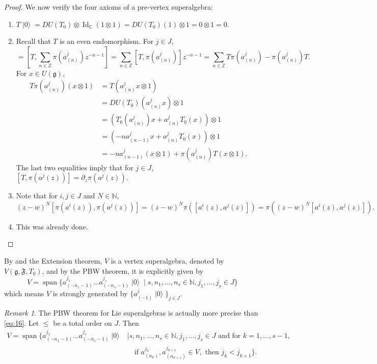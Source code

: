 \documentclass[a4paper, 12pt, reqno]{amsart}
\theoremstyle{remark}
\newtheorem{remark}[theorem]{Remark}
\numberwithin{equation}{subsection}
\DeclareMathOperator{\Id}{Id}
\DeclareMathOperator{\vspan}{span}
\DeclareMathOperator{\vac}{|0\rangle}
\DeclareMathOperator{\one}{\overline{1}}
\begin{document}
\begin{proof}
  We now verify the four axioms of a pre-vertex superalgebra:
  \begin{enumerate}
  \item $T\vac = DU(T_0) \otimes \Id_{\mathbb{C}}(1\otimes1) = DU(T_0)(1)\otimes1 = 0\otimes1 = 0$.
  \item Recall that $T$ is an even endomorphism.
    For $j \in J$,
    \begin{equation*}
      [T, \pi(a^j(z))] = \left[T, \sum_{n \in \mathbb{Z}}\pi(a^j_{(n)})z^{-n - 1}\right] = \sum_{n \in \mathbb{Z}}[T, \pi(a^j_{(n)})]z^{-n - 1} = \sum_{n \in \mathbb{Z}}T\pi(a^j_{(n)}) - \pi(a^j_{(n)})T.
    \end{equation*}
    For $x \in U(\mathfrak{g})$,
    \begin{align*}
      T\pi(a^j_{(n)})(x\otimes1) &= T(a^j_{(n)}x\otimes1) \\
      &= DU(T_0)(a^j_{(n)}x)\otimes1 \\
      &= (T_0(a^j_{(n)})x + a^j_{(n)}T_0(x))\otimes1 \\
      &= (-na^j_{(n - 1)}x + a^j_{(n)}T_0(x))\otimes1 \\
      &= -na^j_{(n - 1)}(x\otimes1) + \pi(a^j_{(n)})T(x\otimes 1).
    \end{align*}
    The last two equalities imply that for $j \in J$, $[T, \pi(a^j(z))] = \partial_z\pi(a^j(z))$.
  \item Note that for $i, j \in J$ and $N \in \mathbb{N}$,
    \begin{equation*}
      (z - w)^N[\pi(a^i(z)), \pi(a^j(z))] = (z - w)^N\pi([a^i(z), a^j(z)]) = \pi((z - w)^N[a^i(z), a^j(z)]).
    \end{equation*}
  \item This was already done. \qedhere
  \end{enumerate}
\end{proof}

By  and the Extension theorem, $V$ is a vertex superalgebra, denoted by $V(\mathfrak{g}, \mathfrak{F}, T_0)$, and by the PBW theorem, it is explicitly given by
\begin{equation}
  \label{eq:16}
  V = \vspan\{a^{j_1}_{(-n_1 - 1)}\dots a^{j_s}_{(-n_s - 1)}\vac \mid s, n_1, \dots, n_s \in \mathbb{N}, j_1, \dots, j_s \in J\}
\end{equation}
which means $V$ is strongly generated by $\{a^j_{(-1)}\vac\}_{j \in J}$.

\begin{remark}
  \label{rmk:14}
  The PBW theorem for Lie superalgebras is actually more precise than \eqref{eq:16}.
  Let $\le$ be a total order on $J$.
  Then
  \begin{equation*}
    \begin{split}
      V = \vspan\{a^{j_1}_{(-n_1 - 1)}\dots a^{j_s}_{(-n_s - 1)}\vac &\mid s, n_1, \dots, n_s \in \mathbb{N}, j_1, \dots, j_s \in J\text{ and for } k = 1, \dots, s - 1, \\
      &\quad \text{if }a^{j_k}_{(n_k)}, a^{j_{k + 1}}_{(n_{k + 1})} \in V_{\one},\text{ then }j_k < j_{k + 1}\}.
    \end{split}
  \end{equation*}
\end{remark}
\end{document}
